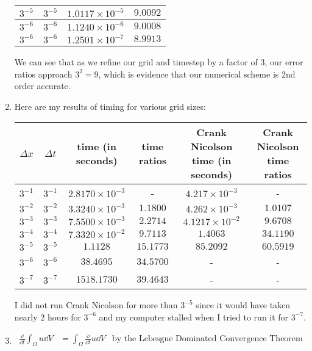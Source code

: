 \documentclass{article} %
\theoremstyle{plain}
\newcommand{\Dx}{\Delta x}
\newcommand{\Dt}{\Delta t}
\numberwithin{equation}{section} %
\numberwithin{figure}{section} %
\numberwithin{table}{section} %
\begin{document}
\begin{enumerate}[\ \ (a)]
\begin{table}[ht!]
\begin{tabular}{||c|c|c|c||}
            $3^{-5}$ & $3^{-5}$ & $1.0117\times10^{-5}$ & $9.0092$ \\\hline
            $3^{-6}$ & $3^{-6}$ & $1.1240\times10^{-6}$ & $9.0008$ \\\hline
            $3^{-6}$ & $3^{-6}$ & $1.2501\times10^{-7}$ & $8.9913$ \\\hline\hline
            \end{tabular}
        \end{table}
        \FloatBarrier
        We can see that as we refine our grid and timestep by a factor of $3$, our error ratios approach $3^2 = 9$, which is evidence that our numerical scheme is 2nd order accurate.
    \item
        Here are my results of timing for various grid sizes:
        \begin{table}[ht!]
            \centering
            \begin{tabular}{||c|c|c|c||c|c||}\hline\hline
                $\Dx$ & $\Dt$ & time (in seconds) & time ratios & Crank Nicolson time (in seconds) & Crank Nicolson time ratios \\\hline\hline
                $3^{-1}$ & $3^{-1}$ & $2.8170\times10^{-3}$ & - & $4.217\times10^{-3}$ & - \\\hline
                $3^{-2}$ & $3^{-2}$ & $3.3240\times10^{-3}$ & $1.1800$ & $4.262\times10^{-3}$ & $1.0107$ \\\hline
                $3^{-3}$ & $3^{-3}$ & $7.5500\times10^{-3}$ & $2.2714$ & $4.1217\times10^{-2}$ & $9.6708$ \\\hline
                $3^{-4}$ & $3^{-4}$ & $7.3320\times10^{-2}$ & $9.7113$ & $1.4063$ & $34.1190$ \\\hline
                $3^{-5}$ & $3^{-5}$ & $1.1128$ & $15.1773$ & $85.2092$ & $60.5919$ \\\hline
                $3^{-6}$ & $3^{-6}$ & $38.4695$ & $34.5700$ & - & - \\\hline
                $3^{-7}$ & $3^{-7}$ & $1518.1730$ & $39.4643$ & - & - \\\hline\hline
            \end{tabular}
        \end{table}
        \FloatBarrier
        I did not run Crank Nicolson for more than $3^{-5}$ since it would have taken nearly 2 hours for $3^{-6}$ and my computer stalled when I tried to run it for $3^{-7}$.
    \item
        \begin{align*}
            \frac{\dd}{\dd t}\int_\Omega u \dd V &= \int_\Omega \frac{\dd}{\dd t}u \dd V & \text{by the Lebesgue Dominated Convergence Theorem}\\

\end{align*}
\end{enumerate}
\end{document}
